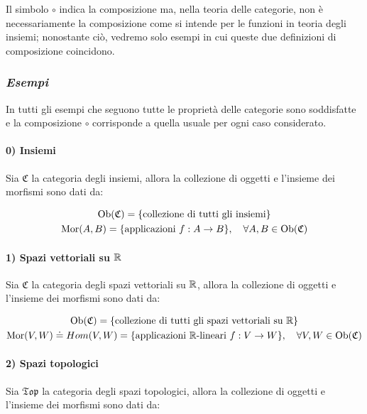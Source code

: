 Il simbolo $ \circ $ indica la composizione ma, nella teoria delle categorie, non è necessariamente la composizione come si intende per le funzioni in teoria degli insiemi; nonostante ciò, vedremo solo esempi in cui queste due definizioni di composizione coincidono.

\subsubsection{\textit{Esempi}}

In tutti gli esempi che seguono tutte le proprietà delle categorie sono soddisfatte e la composizione $ \circ $ corrisponde a quella usuale per ogni caso considerato.

\paragraph{0) Insiemi}

Sia $ \mathfrak{C} $ la categoria degli insiemi, allora la collezione di oggetti e l'insieme dei morfismi sono dati da:

\begin{gather}
	\ob(\mathfrak{C}) = \{ \text{collezione di tutti gli insiemi} \} \\
	\mor(A,B) = \{ \text{applicazioni } f : A \to B \} \qcomma \forall A,B \in \ob(\mathfrak{C})
\end{gather}

\paragraph{1) Spazi vettoriali su $ \mathbb{R} $}

Sia $ \mathfrak{C} $ la categoria degli spazi vettoriali su $ \mathbb{R} $, allora la collezione di oggetti e l'insieme dei morfismi sono dati da:

\begin{gather}
	\ob(\mathfrak{C}) = \{ \text{collezione di tutti gli spazi vettoriali su } \R \} \\
	\mor(V,W) \doteq Hom(V,W) = \{ \text{applicazioni $ \R $-lineari } f : V \to W \} \qcomma \forall V,W \in \ob(\mathfrak{C})
\end{gather}

\paragraph{2) Spazi topologici}

Sia $ \mathfrak{Top} $ la categoria degli spazi topologici, allora la collezione di oggetti e l'insieme dei morfismi sono dati da:

